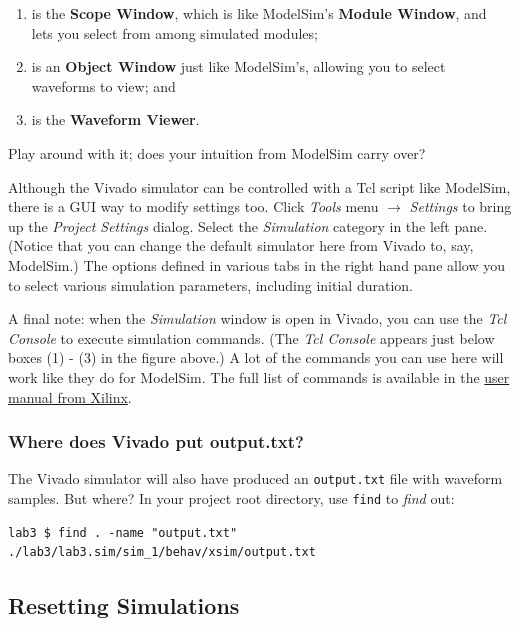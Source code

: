 \documentclass[11pt]{article}
\begin{document}
\begin{enumerate}
  \item is the \textbf{Scope Window}, which is like ModelSim's \textbf{Module Window}, and lets you select from among simulated modules;
  \item is an \textbf{Object Window} just like ModelSim's, allowing you to select waveforms to view; and
  \item is the \textbf{Waveform Viewer}.
\end{enumerate}

Play around with it; does your intuition from ModelSim carry over?

Although the Vivado simulator can be controlled with a Tcl script like ModelSim, there is a GUI way to modify settings too. Click \emph{Tools} menu $\rightarrow$ \emph{Settings} to bring up the \emph{Project Settings} dialog. Select the \emph{Simulation} category in the left pane. (Notice that you can change the default simulator here from Vivado to, say, ModelSim.) The options defined in various tabs in the right hand pane allow you to select various simulation parameters, including initial duration.

A final note: when the \emph{Simulation} window is open in Vivado, you can use the \emph{Tcl Console} to execute simulation commands. (The \emph{Tcl Console} appears just below boxes (1) - (3) in the figure above.) A lot of the commands you can use here will work like they do for ModelSim. The full list of commands is available in the \href{https://www.xilinx.com/support/documentation/sw_manuals/xilinx2016_1/ug937-vivado-design-suite-simulation-tutorial.pdf}{user manual from Xilinx}.

\subsubsection{Where does Vivado put output.txt?}

The Vivado simulator will also have produced an \verb|output.txt| file with waveform samples. But where? In your project root directory, use \verb|find| to \emph{find} out:

\begin{verbatim}
lab3 $ find . -name "output.txt"
./lab3/lab3.sim/sim_1/behav/xsim/output.txt
\end{verbatim}

\subsection{Resetting Simulations}
\end{document}
